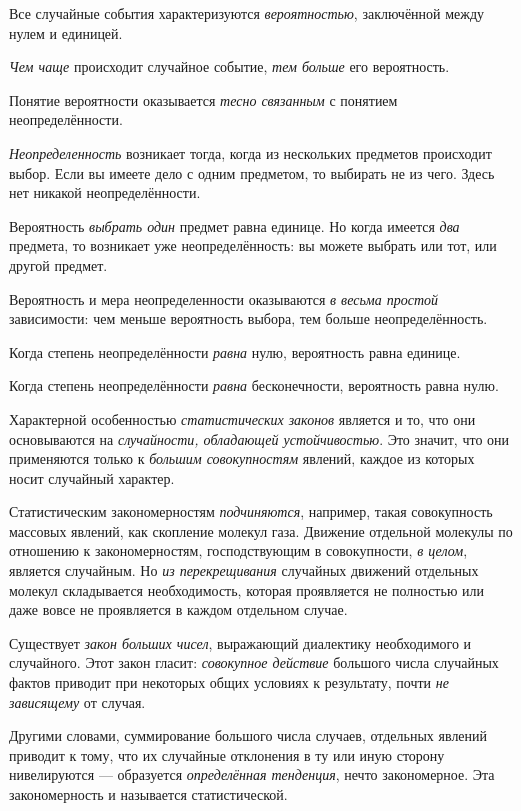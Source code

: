 \documentclass[a4paper,14pt,russian]{extreport}
\begin{document}
Все случайные события характеризуются \emph{вероятностью}, заключённой между нулем и единицей.

\emph{Чем чаще} происходит случайное событие, \emph{тем больше} его вероятность.

Понятие вероятности оказывается \emph{тесно связанным} с понятием неопределённости.

\emph{Неопределенность} возникает тогда, когда из нескольких предметов происходит выбор. Если вы имеете дело с одним предметом, то выбирать не из чего. Здесь нет никакой неопределённости.

Вероятность \emph{выбрать один} предмет равна единице. Но когда имеется \emph{два} предмета, то возникает уже неопределённость: вы можете выбрать или тот, или другой предмет.

Вероятность и мера неопределенности оказываются \emph{в весьма простой} зависимости: чем меньше вероятность выбора, тем больше неопределённость.

Когда степень неопределённости \emph{равна} нулю, вероятность равна единице.

Когда степень неопределённости \emph{равна} бесконечности, вероятность равна нулю.

Характерной особенностью \emph{статистических законов} является и то, что они основываются на \emph{случайности, обладающей устойчивостью}. Это значит, что они применяются только к \emph{большим совокупностям} явлений, каждое из которых носит случайный характер.

Статистическим закономерностям \emph{подчиняются}, например, такая совокупность массовых явлений, как скопление молекул газа. Движение отдельной молекулы по отношению к закономерностям, господствующим в совокупности, \emph{в целом}, является случайным. Но \emph{из перекрещивания} случайных движений отдельных молекул складывается необходимость, которая проявляется не полностью или даже вовсе не проявляется в каждом отдельном случае.

Существует \emph{закон больших чисел}, выражающий диалектику необходимого и случайного. Этот закон гласит: \emph{совокупное действие} большого числа случайных фактов приводит при некоторых общих условиях к результату, почти \emph{не зависящему} от случая.

Другими словами, суммирование большого числа случаев, отдельных явлений приводит к тому, что их случайные отклонения в ту или иную сторону нивелируются --- образуется \emph{определённая тенденция}, нечто закономерное. Эта закономерность и называется статистической.
\end{document}
